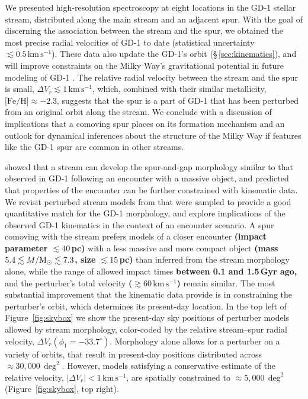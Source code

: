 \documentclass[twocolumn]{aastex63}
\newcommand{\kms}{\ensuremath{\textrm{km}\,\textrm{s}^{-1}}}
\newcommand{\feh}{\ensuremath{\textrm{[Fe/H]}}}
\newcommand{\changes}[1]{{\textbf{#1}}}
\begin{document}
We presented high-resolution spectroscopy at eight locations in the GD-1 stellar stream, distributed along the main stream and an adjacent spur.
With the goal of discerning the association between the stream and the spur, we obtained the most precise radial velocities of GD-1 to date (statistical uncertainty $\lesssim0.5\,\kms$).
These data also update the GD-1's orbit (\S\,\ref{sec:kinematics}), and will improve constraints on the Milky Way's gravitational potential in future modeling of GD-1 \citep[e.g.,][]{koposov2010, bowden2015}.
The relative radial velocity between the stream and the spur is small, $\Delta V_r\lesssim1\,\kms$, which, combined with their similar metallicity, $\feh\approx-2.3$, suggests that the spur is a part of GD-1 that has been perturbed from an original orbit along the stream.
We conclude with a discussion of implications that a comoving spur places on its formation mechanism and an outlook for dynamical inferences about the structure of the Milky Way if features like the GD-1 spur are common in other streams.

\citet{bonaca2019a} showed that a stream can develop the spur-and-gap morphology similar to that observed in GD-1 following an encounter with a massive object, and predicted that properties of the encounter can be further constrained with kinematic data.
We revisit perturbed stream models from \citet{bonaca2019a} that were sampled to provide a good quantitative match for the GD-1 morphology, and explore implications of the observed GD-1 kinematics in the context of an encounter scenario.
A spur comoving with the stream prefers models of a closer encounter \changes{(impact parameter $\lesssim40\,$pc)} with a less massive and more compact object \changes{(mass $5.4\lesssim M/\rm M_\odot \lesssim7.3$, size $\lesssim15\,$pc)} than inferred from the stream morphology alone, while the range of allowed impact times \changes{between 0.1 and 1.5\,Gyr ago,} and the perturber's total velocity \changes{($\gtrsim60\,\kms$)} remain similar.
The most substantial improvement that the kinematic data provide is in constraining the perturber's orbit, which determines its present-day location.
In the top left of Figure~\ref{fig:skybox} we show the present-day sky positions of perturber models allowed by stream morphology, color-coded by the relative stream--spur radial velocity, $\Delta V_r(\phi_1=-33.7^\circ)$.
Morphology alone allows for a perturber on a variety of orbits, that result in present-day positions distributed across $\approx30,000\,\deg^2$.
However, models satisfying a conservative estimate of the relative velocity, $|\Delta V_r|<1\,\kms$, are spatially constrained to $\approx5,000\,\deg^2$ (Figure~\ref{fig:skybox}, top right).
\end{document}
